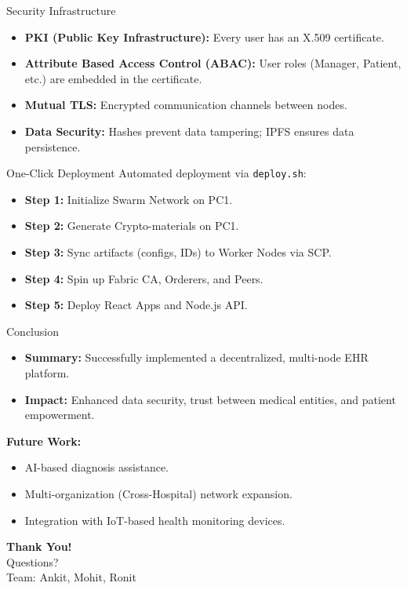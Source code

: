\documentclass[10pt]{beamer}
\begin{document}
\begin{frame}{Security Infrastructure}
    \begin{itemize}
        \item \textbf{PKI (Public Key Infrastructure):} Every user has an X.509 certificate.
        \item \textbf{Attribute Based Access Control (ABAC):} User roles (Manager, Patient, etc.) are embedded in the certificate.
        \item \textbf{Mutual TLS:} Encrypted communication channels between nodes.
        \item \textbf{Data Security:} Hashes prevent data tampering; IPFS ensures data persistence.
    \end{itemize}
\end{frame}

\begin{frame}[fragile]{One-Click Deployment}
    Automated deployment via \texttt{deploy.sh}:
    \begin{itemize}
        \item \textbf{Step 1:} Initialize Swarm Network on PC1.
        \item \textbf{Step 2:} Generate Crypto-materials on PC1.
        \item \textbf{Step 3:} Sync artifacts (configs, IDs) to Worker Nodes via SCP.
        \item \textbf{Step 4:} Spin up Fabric CA, Orderers, and Peers.
        \item \textbf{Step 5:} Deploy React Apps and Node.js API.
    \end{itemize}
\end{frame}

\begin{frame}{Conclusion}
    \begin{itemize}
        \item \textbf{Summary:} Successfully implemented a decentralized, multi-node EHR platform.
        \item \textbf{Impact:} Enhanced data security, trust between medical entities, and patient empowerment.
    \end{itemize}
    \vfill
    \textbf{Future Work:}
    \begin{itemize}
        \item AI-based diagnosis assistance.
        \item Multi-organization (Cross-Hospital) network expansion.
        \item Integration with IoT-based health monitoring devices.
    \end{itemize}
\end{frame}

\begin{frame}
    \begin{center}
        \Huge \textbf{Thank You!} \\
        \vfill
        \Large Questions? \\
        \vfill
        \small Team: Ankit, Mohit, Ronit
    \end{center}
\end{frame}
\end{document}
